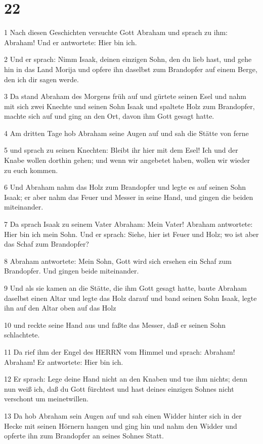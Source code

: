 \chapter{22}

\par 1 Nach diesen Geschichten versuchte Gott Abraham und sprach zu ihm: Abraham! Und er antwortete: Hier bin ich.
\par 2 Und er sprach: Nimm Isaak, deinen einzigen Sohn, den du lieb hast, und gehe hin in das Land Morija und opfere ihn daselbst zum Brandopfer auf einem Berge, den ich dir sagen werde.
\par 3 Da stand Abraham des Morgens früh auf und gürtete seinen Esel und nahm mit sich zwei Knechte und seinen Sohn Isaak und spaltete Holz zum Brandopfer, machte sich auf und ging an den Ort, davon ihm Gott gesagt hatte.
\par 4 Am dritten Tage hob Abraham seine Augen auf und sah die Stätte von ferne
\par 5 und sprach zu seinen Knechten: Bleibt ihr hier mit dem Esel! Ich und der Knabe wollen dorthin gehen; und wenn wir angebetet haben, wollen wir wieder zu euch kommen.
\par 6 Und Abraham nahm das Holz zum Brandopfer und legte es auf seinen Sohn Isaak; er aber nahm das Feuer und Messer in seine Hand, und gingen die beiden miteinander.
\par 7 Da sprach Isaak zu seinem Vater Abraham: Mein Vater! Abraham antwortete: Hier bin ich mein Sohn. Und er sprach: Siehe, hier ist Feuer und Holz; wo ist aber das Schaf zum Brandopfer?
\par 8 Abraham antwortete: Mein Sohn, Gott wird sich ersehen ein Schaf zum Brandopfer. Und gingen beide miteinander.
\par 9 Und als sie kamen an die Stätte, die ihm Gott gesagt hatte, baute Abraham daselbst einen Altar und legte das Holz darauf und band seinen Sohn Isaak, legte ihn auf den Altar oben auf das Holz
\par 10 und reckte seine Hand aus und faßte das Messer, daß er seinen Sohn schlachtete.
\par 11 Da rief ihm der Engel des HERRN vom Himmel und sprach: Abraham! Abraham! Er antwortete: Hier bin ich.
\par 12 Er sprach: Lege deine Hand nicht an den Knaben und tue ihm nichts; denn nun weiß ich, daß du Gott fürchtest und hast deines einzigen Sohnes nicht verschont um meinetwillen.
\par 13 Da hob Abraham sein Augen auf und sah einen Widder hinter sich in der Hecke mit seinen Hörnern hangen und ging hin und nahm den Widder und opferte ihn zum Brandopfer an seines Sohnes Statt.

